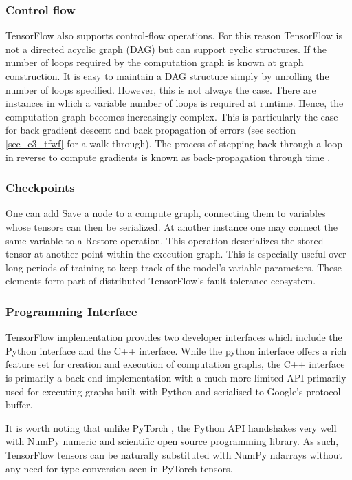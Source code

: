 \subsubsection{Control flow}
TensorFlow also supports control-flow operations.  For this reason TensorFlow is not a directed acyclic graph (DAG) but can support cyclic structures. If the number of loops required by the computation graph is known at graph construction.  It is easy to maintain a DAG structure simply by unrolling the number of loops specified.  However, this is not always the case.  There are instances in which a variable number of loops is required at runtime.  Hence, the computation graph becomes increasingly complex.  This is particularly the case for back gradient descent and back propagation of errors (see section \ref{sec_c3_tfwf} for a  walk through).  The process of stepping back through a loop in reverse to compute gradients is known as back-propagation through time \citep{al2016theano}.

\subsubsection{Checkpoints}
One can add Save a node to a compute graph, connecting them to variables whose tensors can then be serialized. At another instance one may connect the same variable to a Restore operation. This operation deserializes the stored tensor at another point within the execution graph. This is especially useful over long periods of training to keep track of the model’s variable parameters. These elements form part of distributed TensorFlow's fault tolerance ecosystem.

\subsubsection{Programming Interface}
TensorFlow implementation provides two developer interfaces which include the Python interface and the C++ interface.  While the python interface offers a rich feature set for creation and execution of computation graphs, the C++ interface is primarily a back end implementation with a much more limited API primarily used for executing graphs built with Python and serialised to Google’s protocol buffer.

It is worth noting that unlike PyTorch \citep{ketkar2017introduction}, the Python API handshakes very well with NumPy\citep{numpy} numeric and scientific open source programming library. As such, TensorFlow tensors can be naturally substituted with NumPy ndarrays without any need for type-conversion seen in PyTorch tensors.
